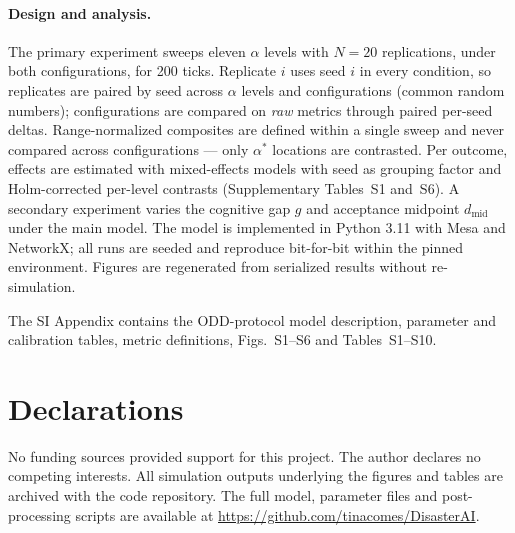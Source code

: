 \documentclass[pdflatex,sn-nature]{sn-jnl}
\begin{document}
\paragraph{Design and analysis.} The primary experiment sweeps eleven $\alpha$ levels with $N = 20$ replications, under both configurations, for 200 ticks. Replicate $i$ uses seed $i$ in every condition, so replicates are paired by seed across $\alpha$ levels and configurations (common random numbers); configurations are compared on \emph{raw} metrics through paired per-seed deltas. Range-normalized composites are defined within a single sweep and never compared across configurations --- only $\alpha^{*}$ locations are contrasted. Per outcome, effects are estimated with mixed-effects models with seed as grouping factor and Holm-corrected per-level contrasts (Supplementary Tables~S1 and~S6). A secondary experiment varies the cognitive gap $g$ and acceptance midpoint $d_{\text{mid}}$ under the main model. The model is implemented in Python 3.11 with Mesa and NetworkX; all runs are seeded and reproduce bit-for-bit within the pinned environment. Figures are regenerated from serialized results without re-simulation.

\backmatter

The SI Appendix contains the ODD-protocol model description, parameter and calibration tables, metric definitions, Figs.~S1--S6 and Tables~S1--S10.


\section*{Declarations}

 No funding sources provided support for this project.
 The author declares no competing interests.
 All simulation outputs underlying the figures and tables are archived with the code repository.
 The full model, parameter files and post-processing scripts are available at \url{https://github.com/tinacomes/DisasterAI}.


\end{document}
